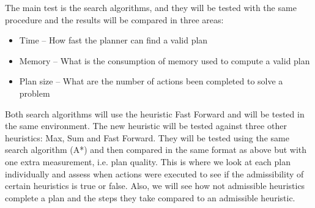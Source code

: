 The main test is the search algorithms, and they will be tested with the same procedure and the results will be compared in three areas:
\begin{itemize}
\item Time – How fast the planner can find a valid plan
\item Memory – What is the consumption of memory used to compute a valid plan
\item Plan size – What are the number of actions been completed to solve a problem 
\end{itemize}
Both search algorithms will use the heuristic Fast Forward and will be tested in the same environment. 
The new heuristic will be tested against three other heuristics: Max, Sum and Fast Forward. They will be tested using the same search algorithm (A*) and then compared in the same format as above but with one extra measurement, i.e. plan quality. This is where we look at each plan individually and assess when actions were executed to see if the admissibility of certain heuristics is true or false. Also, we will see how not admissible heuristics complete a plan and the steps they take compared to an admissible heuristic.
